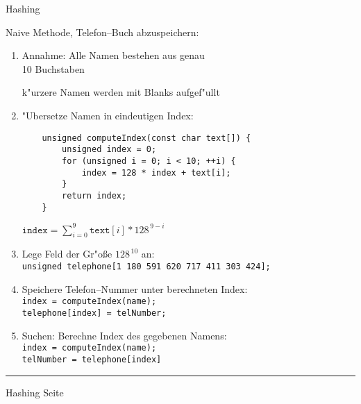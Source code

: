 \documentclass{slides}
\newcounter{mypage}
\begin{document}
\begin{center}
Hashing
\end{center}


\footnotesize
Naive Methode, Telefon--Buch abzuspeichern:
\begin{enumerate}
\item Annahme: Alle Namen bestehen aus genau \\
      10 Buchstaben 

      k"urzere Namen werden mit Blanks aufgef"ullt
\item "Ubersetze Namen in eindeutigen Index:
    \begin{verbatim}
    unsigned computeIndex(const char text[]) {
        unsigned index = 0;
        for (unsigned i = 0; i < 10; ++i) {
            index = 128 * index + text[i];
        }
        return index;
    }
    \end{verbatim} 
    \vspace*{-1.0cm}

    \hspace*{1.0cm} $\mathtt{index} = \sum\limits_{i=0}^9 \mathtt{text}[i] * 128^{\,9-i}$
\item Lege Feld der Gr"o{\ss}e $128^{\,10}$ an: \\[0.3cm]
      \hspace*{1.3cm} \texttt{unsigned telephone[1\,180\,591\,620\,717\,411\,303\,424];}
\item Speichere Telefon--Nummer unter berechneten Index: \\[0.3cm]
      \hspace*{1.3cm} \texttt{index = computeIndex(name);} \\[0.3cm]
      \hspace*{1.3cm} \texttt{telephone[index] = telNumber;}
\item Suchen: Berechne Index des gegebenen Namens: \\[0.3cm]
      \hspace*{1.3cm} \texttt{index = computeIndex(name);} \\[0.3cm]
      \hspace*{1.3cm} \texttt{telNumber = telephone[index]}
\end{enumerate}


\vspace*{0.2cm}

\scriptsize

\vspace*{\fill}
\tiny \addtocounter{mypage}{1}
\rule{17cm}{1mm}
Hashing   \hspace*{\fill} Seite 



\end{document}
